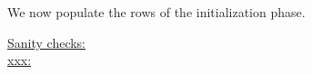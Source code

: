 
We now populate the rows of the initialization phase.
\begin{description}
	\item[\underline{\underline{Sanity checks:}}]
	\item[\underline{\underline{xxx:}}]
		
\end{description}
